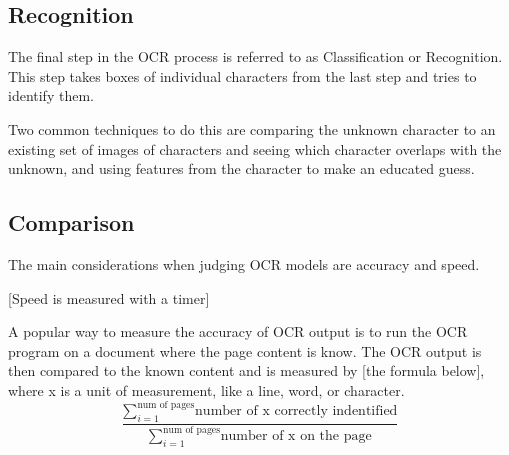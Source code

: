 \documentclass[sigplan,screen,nonacm]{acmart-tagged}
\begin{document}

\subsection{Recognition}
\label{Recognition}

The final step in the OCR process is referred to as Classification or Recognition. This step takes boxes of individual characters from the last step and tries to identify them. 

Two common techniques to do this are comparing the unknown character to an existing set of images of characters and seeing which character overlaps with the unknown, and using features from the character to make an educated guess.\citep{Thorat:2022}

%

\subsection{Comparison}
\label{comparison}

The main considerations when judging OCR models are accuracy and speed.\cite{Raj:2022} 

[Speed is measured with a timer]

A popular way to measure the accuracy of OCR output is to run the OCR program on a document where the page content is know. The OCR output is then compared to the known content and is measured by [the formula below], where x is a unit of measurement, like a line, word, or character.
\[
\dfrac{\sum\limits_{i=1}^\text{num of pages}\text{number of x correctly indentified}}{\sum\limits_{i=1}^\text{num of pages}\text{number of x on the page}}
\]
\end{document}
